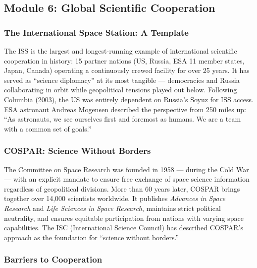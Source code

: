 \documentclass[11pt,letterpaper]{article}
\begin{document}
\subsection{Module 6: Global Scientific Cooperation}

\subsubsection{The International Space Station: A Template}

The ISS is the largest and longest-running example of international scientific cooperation in history: 15 partner nations (US, Russia, ESA 11 member states, Japan, Canada) operating a continuously crewed facility for over 25 years. It has served as ``science diplomacy'' at its most tangible --- democracies and Russia collaborating in orbit while geopolitical tensions played out below. Following Columbia (2003), the US was entirely dependent on Russia's Soyuz for ISS access. ESA astronaut Andreas Mogensen described the perspective from 250 miles up: ``As astronauts, we see ourselves first and foremost as humans. We are a team with a common set of goals.''

\subsubsection{COSPAR: Science Without Borders}

The Committee on Space Research was founded in 1958 --- during the Cold War --- with an explicit mandate to ensure free exchange of space science information regardless of geopolitical divisions. More than 60 years later, COSPAR brings together over 14,000 scientists worldwide. It publishes \textit{Advances in Space Research} and \textit{Life Sciences in Space Research}, maintains strict political neutrality, and ensures equitable participation from nations with varying space capabilities. The ISC (International Science Council) has described COSPAR's approach as the foundation for ``science without borders.''

\subsubsection{Barriers to Cooperation}
\end{document}
